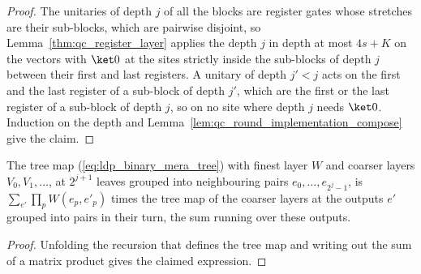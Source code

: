 \begin{proof}
    \leanok
    The unitaries of depth $j$ of all the blocks are register gates whose
    stretches are their sub-blocks, which are pairwise disjoint, so
    Lemma~\ref{thm:qc_register_layer} applies the depth $j$ in depth at most
    $4s+K$ on the vectors with $\ket0$ at the sites strictly inside the
    sub-blocks of depth $j$ between their first and last registers. A unitary
    of depth $j'<j$ acts on the first and the last register of a sub-block of
    depth $j'$, which are the first or the last register of a sub-block of
    depth $j$, so on no site where depth $j$ needs $\ket0$. Induction on the
    depth and Lemma~\ref{lem:qc_round_implementation_compose} give the claim.
\end{proof}

\begin{lemma}
    \label{lem:ldp_tree_amplitudes}
    \leanok
    The tree map (\ref{eq:ldp_binary_mera_tree}) with finest layer $W$ and
    coarser layers $V_0,V_1,\dots$, at $2^{j+1}$ leaves grouped into
    neighbouring pairs $e_0,\dots,e_{2^j-1}$, is $\sum_{e'}\prod_pW(e_p,e'_p)$
    times the tree map of the coarser layers at the outputs $e'$ grouped into
    pairs in their turn, the sum running over these outputs.
\end{lemma}
\begin{proof}
    \leanok
    Unfolding the recursion that defines the tree map and writing out the sum
    of a matrix product gives the claimed expression.
\end{proof}

